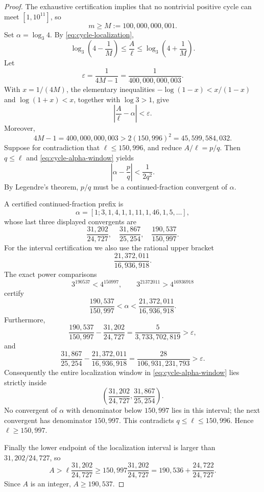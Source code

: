 \documentclass[11pt]{article}
\theoremstyle{definition}
\theoremstyle{remark}
\begin{document}
\begin{proof}
The exhaustive certification implies that no nontrivial positive cycle can meet $[1,10^{11}]$, so
\[
m\ge M:=100{,}000{,}000{,}001.
\]
Set $\alpha=\log_3 4$.  By \eqref{eq:cycle-localization},
\[
\log_3\left(4-\frac1M\right)
\le \frac A\ell\le
\log_3\left(4+\frac1M\right).
\]
Let
\[
\varepsilon=\frac1{4M-1}=\frac1{400{,}000{,}000{,}003}.
\]
With $x=1/(4M)$, the elementary inequalities
$-\log(1-x)<x/(1-x)$ and $\log(1+x)<x$, together with $\log3>1$, give
\begin{equation}
\left|\frac A\ell-\alpha\right|<\varepsilon.
\label{eq:cycle-alpha-window}
\end{equation}
Moreover,
\[
4M-1=400{,}000{,}000{,}003
>
2(150{,}996)^2=45{,}599{,}584{,}032.
\]
Suppose for contradiction that $\ell\le150{,}996$, and reduce $A/\ell=p/q$.  Then $q\le\ell$ and \eqref{eq:cycle-alpha-window} yields
\[
\left|\alpha-\frac pq\right|
<\frac1{2q^2}.
\]
By Legendre's theorem, $p/q$ must be a continued-fraction convergent of $\alpha$.

A certified continued-fraction prefix is
\[
\alpha=[1;3,1,4,1,1,11,1,46,1,5,\ldots],
\]
whose last three displayed convergents are
\[
\frac{31{,}202}{24{,}727},\quad
\frac{31{,}867}{25{,}254},\quad
\frac{190{,}537}{150{,}997}.
\]
For the interval certification we also use the rational upper bracket
\[
\frac{21{,}372{,}011}{16{,}936{,}918}.
\]
The exact power comparisons
\[
3^{190537}<4^{150997},
\qquad
3^{21372011}>4^{16936918}
\]
certify
\[
\frac{190{,}537}{150{,}997}<\alpha<
\frac{21{,}372{,}011}{16{,}936{,}918}.
\]
Furthermore,
\[
\frac{190{,}537}{150{,}997}-
\frac{31{,}202}{24{,}727}
=
\frac5{3{,}733{,}702{,}819}
>\varepsilon,
\]
and
\[
\frac{31{,}867}{25{,}254}-
\frac{21{,}372{,}011}{16{,}936{,}918}
=
\frac{28}{106{,}931{,}231{,}793}
>\varepsilon.
\]
Consequently the entire localization window in \eqref{eq:cycle-alpha-window} lies strictly inside
\[
\left(
\frac{31{,}202}{24{,}727},
\frac{31{,}867}{25{,}254}
\right).
\]
No convergent of $\alpha$ with denominator below $150{,}997$ lies in this interval; the next convergent has denominator $150{,}997$.  This contradicts $q\le\ell\le150{,}996$.  Hence $\ell\ge150{,}997$.

Finally the lower endpoint of the localization interval is larger than $31{,}202/24{,}727$, so
\[
A>
\ell\frac{31{,}202}{24{,}727}
\ge
150{,}997\frac{31{,}202}{24{,}727}
=
190{,}536+\frac{24{,}722}{24{,}727}.
\]
Since $A$ is an integer, $A\ge190{,}537$.
\end{proof}
\end{document}
